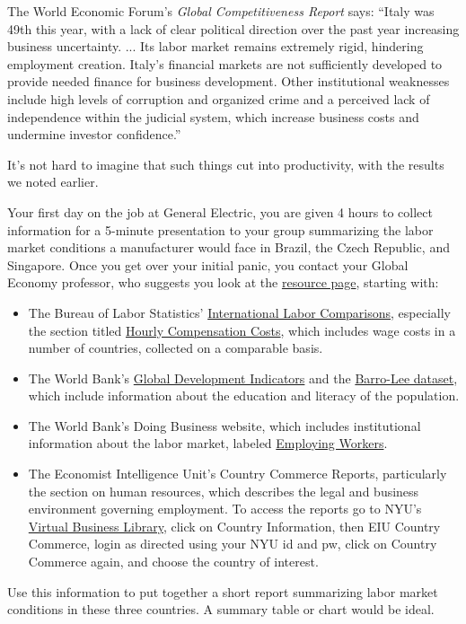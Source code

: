 \documentclass[12pt]{exam}
\begin{document}
\begin{questions}
\begin{solution}
\begin{parts}
The World Economic Forum's {\it Global Competitiveness Report\/} says:
``Italy was 49th this year, with a lack of clear political direction over the past year increasing business
uncertainty. ...
Its labor market remains extremely rigid, hindering employment creation.
Italy's  financial markets are not sufficiently developed to provide
needed finance for business development.
Other institutional weaknesses include high levels of
corruption and organized crime and a perceived lack of
independence within the judicial system, which increase
business costs and undermine investor confidence.''

It's not hard to imagine that such things cut into productivity,
with the results we noted earlier.
\end{parts}
\end{solution}

Your first day on the job at General Electric,
you are given 4 hours to collect information for a 5-minute
presentation to your group summarizing the labor market
conditions a manufacturer would face in Brazil, the Czech Republic, and Singapore.
Once you get over your initial panic, you contact your Global Economy
professor, who suggests you look at the
\href{http://pages.stern.nyu.edu/~dbackus/macro_resources.htm}{resource page},
starting with:
%
\begin{itemize}
\item The Bureau of Labor Statistics'
\href{http://www.bls.gov/fls/}{International Labor Comparisons},
especially the section titled
\href{http://www.bls.gov/fls/ichcc.htm}{Hourly Compensation Costs},
which includes wage costs in a number of countries,
collected on a comparable basis.

\item The World Bank's
\href{http://data.worldbank.org/topic}{Global Development Indicators}
and the
\href{http://www.barrolee.com/}{Barro-Lee dataset},
which include
information about the education and literacy of the population.

\item The World Bank's Doing Business website, which includes
institutional information about the labor market,
labeled
\href{http://www.doingbusiness.org/data/exploretopics/employing-workers}
{Employing Workers}.

\item The Economist Intelligence Unit's {Country Commerce Reports},
particularly the section on human resources,
which describes the legal and business environment governing employment.
To access the reports go to NYU's
\href{http://library.nyu.edu/vbl/}{Virtual Business Library},
click on Country Information, then EIU Country Commerce,
login as directed using your NYU id and pw,
click on Country Commerce again, and choose the country of interest.
\end{itemize}
%
Use this information to put together a short report
summarizing labor market conditions in these three countries.
A summary table or chart would be ideal.


\end{questions}
\end{document}
